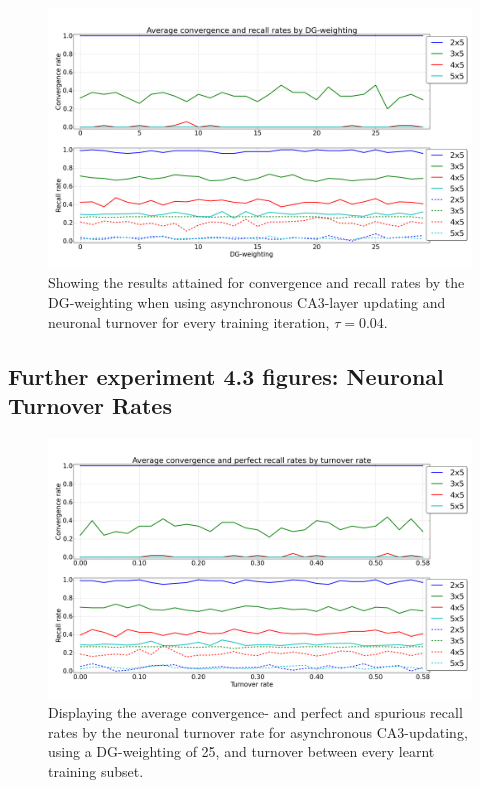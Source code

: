 \begin{figure}
    \centering
    \includegraphics[width=13cm]{fig/DGWs/async_tm1_04}
    \caption{Showing the results attained for convergence and recall rates by the DG-weighting when using asynchronous CA3-layer updating and neuronal turnover for every training iteration, $\tau=0.04$.}
    \label{fig:async_tm1_04}
\end{figure}

\subsection*{Further experiment 4.3 figures: Neuronal Turnover Rates}

\begin{figure}
    \centering
    \includegraphics[width=13cm]{fig/turnover_rates/async_tm0_dgw25}
    \caption{Displaying the average convergence- and perfect and spurious recall rates by the neuronal turnover rate for asynchronous CA3-updating, using a DG-weighting of 25, and turnover between every learnt training subset.}
    \label{fig:async_tm0_dgw25}
\end{figure}

